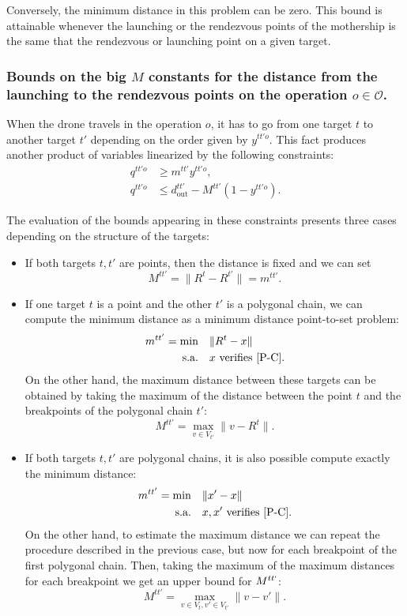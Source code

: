 Conversely, the minimum distance in this problem can be zero. This bound is attainable whenever the launching or the rendezvous points of the mothership is the same that the rendezvous or launching point on a given  target.

\subsubsection*{Bounds on the big $M$ constants for the distance from the launching to the rendezvous points on the operation $o\in \mathcal{O}$.} When the drone travels in the operation $o$, it has to go from one target $t$ to another target $t'$ depending on the order given by $y^{tt'o}$. This fact produces another product of variables linearized by the following constraints:
\begin{align*}
q^{tt'o} & \geq m^{tt'} y^{tt'o}, \\
q^{tt'o} & \leq d^{tt'}_{\text{out}} - M^{tt'}(1-y^{tt'o}).
\end{align*}

\noindent
The evaluation of the bounds appearing in these constraints presents three cases depending on the structure of the targets:
\begin{itemize}
    \item If both targets $t, t'$ are points, then the distance is fixed and we can set
    $$M^{tt'} = \|R^t - R^{t'}\| = m^{tt'}.$$
    \item If one target $t$ is a point and the other $t'$ is a polygonal chain, we can compute the minimum distance as a minimum distance point-to-set problem:
    \begin{align*}
        m^{tt'} = \text{min} &\quad\|R^{t}- x\| \\
                  \text{s.a.} &\quad x\text{ verifies }\eqref{P-C}.
    \end{align*}
    On the other hand, the maximum distance between these targets can be obtained by taking the maximum of the distance between the point $t$ and the breakpoints of the polygonal chain $t'$:
    $$M^{tt'} = \max_{v\in V_{t'}}{\|v - R^t\|}.$$
    \item If both targets $t, t'$ are polygonal chains, it is also possible compute exactly the minimum distance:
    \begin{align*}
        m^{tt'} = \text{min} &\quad\|x'- x\| \\
                  \text{s.a.} &\quad x, x'\text{ verifies }\eqref{P-C}. 
    \end{align*}
    On the other hand, to estimate the maximum distance we can repeat the procedure described in the previous case, but now for each breakpoint of the first polygonal chain. Then, taking the maximum of the maximum distances for each breakpoint we get an upper bound for $M^{tt`}$:
    $$M^{tt'} = \max_{v\in V_{t}, v'\in V_{t'}}{\|v - v'\|}.$$
    
\end{itemize}

